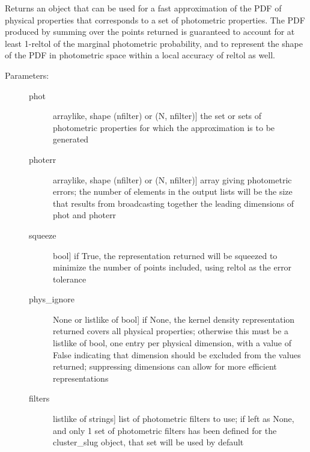 \documentclass[letterpaper,10pt,english]{sphinxmanual}
\begin{document}
\begin{fulllineitems}
\begin{fulllineitems}
\label{\detokenize{cluster_slug:slugpy.cluster_slug.cluster_slug.make_approx_phys}}
Returns an object that can be used for a fast approximation of
the PDF of physical properties that corresponds to a set of
photometric properties. The PDF produced by summing over the
points returned is guaranteed to account for at least 1-reltol
of the marginal photometric probability, and to represent the
shape of the PDF in photometric space within a local accuracy
of reltol as well.
\begin{description}
\item[{Parameters:}] \leavevmode\begin{description}
\item[{phot}] \leavevmode{[}arraylike, shape (nfilter) or (N, nfilter){]}
the set or sets of photometric properties for which the
approximation is to be generated

\item[{photerr}] \leavevmode{[}arraylike, shape (nfilter) or (N, nfilter){]}
array giving photometric errors; the number of elements
in the output lists will be the size that results from
broadcasting together the leading dimensions of phot and
photerr

\item[{squeeze}] \leavevmode{[}bool{]}
if True, the representation returned will be squeezed to
minimize the number of points included, using reltol as
the error tolerance

\item[{phys\_ignore}] \leavevmode{[}None or listlike of bool{]}
if None, the kernel density representation returned
covers all physical properties; otherwise this must be a
listlike of bool, one entry per physical dimension, with
a value of False indicating that dimension should be
excluded from the values returned; suppressing
dimensions can allow for more efficient representations

\item[{filters}] \leavevmode{[}listlike of strings{]}
list of photometric filters to use; if left as None, and
only 1 set of photometric filters has been defined for
the cluster\_slug object, that set will be used by
default

\end{description}


\end{description}
\end{fulllineitems}
\end{fulllineitems}
\end{document}
